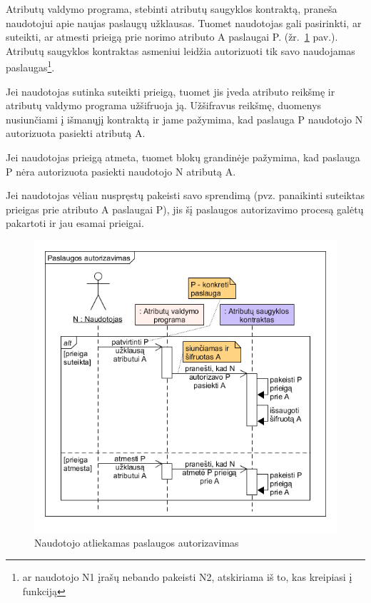 Atributų valdymo programa, stebinti atributų saugyklos kontraktą, praneša naudotojui apie naujas
paslaugų užklausas. Tuomet naudotojas gali pasirinkti, ar suteikti, ar atmesti prieigą prie norimo atributo
A paslaugai P. (žr.\hypertarget{fig:givePermissions}{~\ref{fig:givePermissions} pav.}). Atributų saugyklos kontraktas
asmeniui leidžia autorizuoti tik savo naudojamas paslaugas\footnote{ ar naudotojo N1 įrašų nebando pakeisti N2, atskiriama iš
to, kas kreipiasi į funkciją}.

Jei naudotojas sutinka suteikti prieigą, tuomet jis įveda atributo reikšmę ir atributų valdymo programa užšifruoja ją.
Užšifravus reikšmę, duomenys nusiunčiami į išmanųjį kontraktą ir jame pažymima, kad paslauga P naudotojo N autorizuota
pasiekti atributą A.

Jei naudotojas prieigą atmeta, tuomet blokų grandinėje pažymima, kad paslauga P nėra autorizuota pasiekti naudotojo N atributą A.

Jei naudotojas vėliau nuspręstų pakeisti savo sprendimą (pvz. panaikinti suteiktas prieigas prie atributo A paslaugai P),
jis šį paslaugos autorizavimo procesą galėtų pakartoti ir jau esamai prieigai.


\begin{figure}[h]
    \centering
    \includegraphics[scale=0.65]{img/givePermissions}
    \caption{Naudotojo atliekamas paslaugos autorizavimas}
    \label{fig:givePermissions}
\end{figure}


